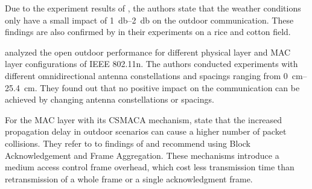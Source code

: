 Due to the experiment results of \cite{chebrolu_long-distance_2006}, the authors state that the weather conditions only have a
small impact of \SIrange{1}{2}{\decibel} on the outdoor communication. These findings are also confirmed by \cite{brinkhoff_characterization_2017}
in their experiments on a rice and cotton field.

\textcite{paul_characterizing_2011} analyzed the open outdoor performance for different physical layer and MAC layer configurations of
IEEE 802.11n. The authors conducted experiments with different omnidirectional antenna constellations and spacings ranging from
\SIrange{0}{25.4}{\centi\metre}. They found out that no positive impact on the communication can be achieved by
changing antenna constellations or spacings.

For the MAC layer with its \ac{CSMACA} mechanism,\textcite{aust_outdoor_2015} state that the increased propagation delay in outdoor scenarios
can cause a higher number of packet collisions. They refer to to findings of \cite{paul_characterizing_2011} and recommend
using Block Acknowledgement and Frame Aggregation. These mechanisms introduce a medium access control frame overhead, which cost less transmission time than
retransmission of a whole frame or a single acknowledgment frame.


